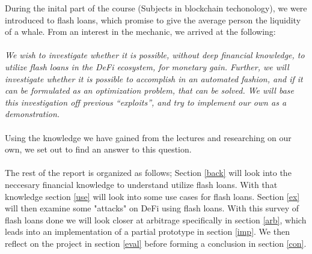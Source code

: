 During the inital part of the course (Subjects in blockchain techonology), we
were introduced to flash loans, which promise to give the average person the
liquidity of a whale. From an interest in the mechanic, we arrived at the
following:\\\\
\textit{We wish to investigate whether it is possible, without deep financial
knowledge, to utilize flash loans in the DeFi ecosystem, for monetary
gain. Further, we will investigate whether it is possible to accomplish in
an automated fashion, and if it can be formulated as an optimization
problem, that can be solved. We will base this investigation off previous
``exploits'', and try to implement our own as a demonstration.}\\\\
Using the knowledge we have gained from the lectures and researching on our own,
we set out to find an answer to this question.\\\\
The rest of the report is organized as follows; Section \ref{back}
will look into the neccesary financial knowledge to understand utilize
flash loans. With that knowledge section \ref{use} will look into some
use cases for flash loans. Section \ref{ex} will then examine some
"attacks" on DeFi using flash loans. With this survey of flash loans
done we will look closer at arbitrage specifically in section
\ref{arb}, which leads into an implementation of a partial prototype in
section \ref{imp}. We then reflect on the project in section \ref{eval}
before forming a conclusion in section \ref{con}.
